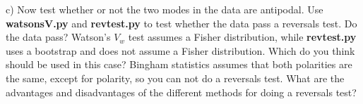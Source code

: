 {c) Now test whether or not  the two modes in the data are antipodal.    Use {\bf watsonsV.py} and {\bf revtest.py} to test whether the data pass a reversals test.    Do the data pass?  
Watson's $V_w$ test assumes a Fisher distribution, while {\bf revtest.py} uses a bootstrap and does not assume a Fisher distribution.   Which do you think should be used in this case?    Bingham statistics assumes that both polarities are the same, except for polarity, so you can not do a reversals test.   What are the advantages and disadvantages of the different methods for doing a reversals test? 

}
